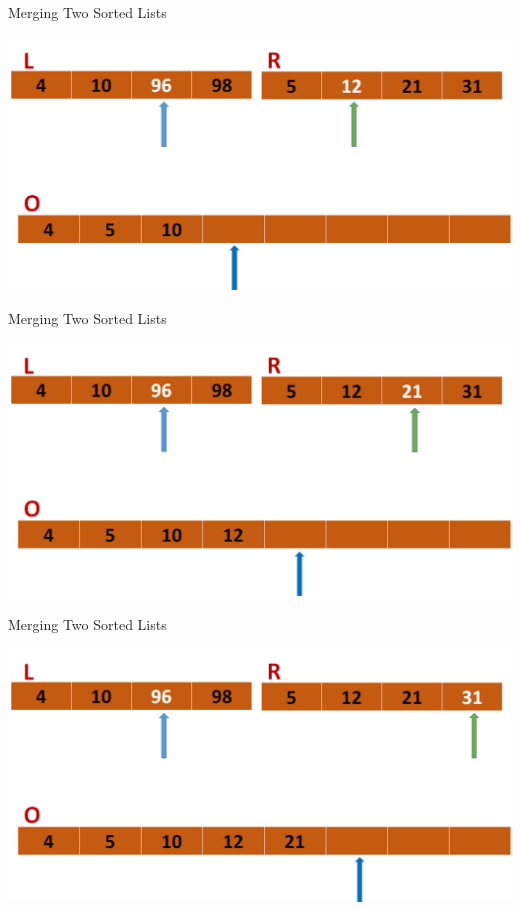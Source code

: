 \documentclass{beamer}
\begin{document}
\begin{frame}{Merging Two Sorted Lists}
\begin{center}
    \includegraphics[scale=0.4]{mergeStep4.png}
\end{center}
\end{frame}




\begin{frame}{Merging Two Sorted Lists}
\begin{center}
    \includegraphics[scale=0.4]{mergeStep5.png}
\end{center}
\end{frame}




\begin{frame}{Merging Two Sorted Lists}
\begin{center}
    \includegraphics[scale=0.4]{mergeStep6.png}
\end{center}
\end{frame}
\end{document}
